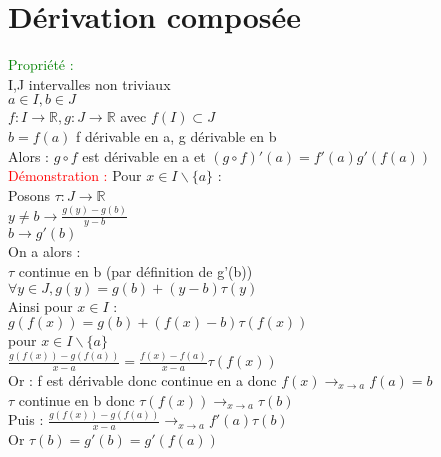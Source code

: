\documentclass{article}
\begin{document}
\section{Dérivation composée}
\textcolor{green}{Propriété :} \\ 
I,J intervalles non triviaux \\ 
$a \in I, b \in J$ \\ 
$f: I \rightarrow \mathbb{R}, g: J \rightarrow \mathbb{R}$ avec $f(I ) \subset J$ \\ 
$b=f(a)$ f dérivable en a, g dérivable en b \\ 
Alors : $g \circ f$ est dérivable en a et $(g \circ f)'(a)=f'(a)g'(f(a))$ \\ 
\textcolor{red}{Démonstration :} Pour $x \in I \backslash \lbrace a \rbrace$ : \\ 
Posons $\tau : J \rightarrow \mathbb{R}$ \\ 
$y \neq b \rightarrow \frac{g(y)-g(b)}{y-b}$ \\ 
$b \rightarrow g'(b)$ \\ 
On a alors : \\ 
$\tau$ continue en b (par définition de g'(b)) \\ 
$\forall y \in J, g(y)=g(b)+(y-b)\tau(y)$ \\ 
Ainsi pour $x \in I$ : \\ 
$g(f(x))=g(b)+(f(x)-b)\tau(f(x))$ \\ 
pour $x \in I \backslash \lbrace a \rbrace$ \\ 
$\frac{g(f(x))-g(f(a))}{x-a}= \frac{f(x)-f(a)}{x-a} \tau(f(x))$ \\ 
Or : f est dérivable donc continue en a donc $f(x) \rightarrow_{x \rightarrow a} f(a)=b$ \\ 
$\tau$ continue en b donc $\tau(f(x)) \rightarrow_{x \rightarrow a} \tau(b)$ \\ 
Puis : $ \frac{g(f(x))-g(f(a))}{x-a} \rightarrow_{x \rightarrow a} f'(a)\tau(b)$ \\ 
Or $\tau(b)=g'(b)=g'(f(a))$
\end{document}
